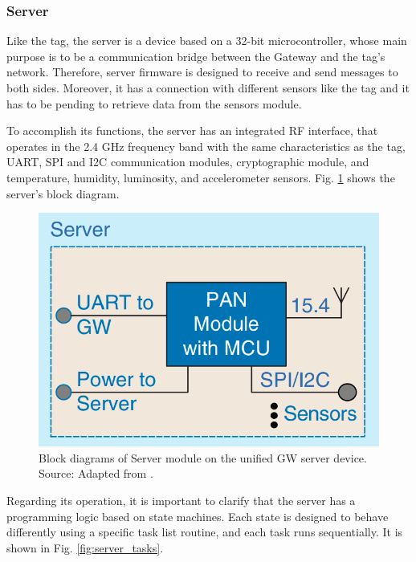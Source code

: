 \documentclass[journal]{IEEEtran}	%
\begin{document}
\subsubsection{Server}


Like the tag, the server is a device based on a 32-bit microcontroller, whose main purpose is to be a communication bridge between the Gateway and the tag's network. Therefore, server firmware is designed to receive and send messages to both sides. Moreover, it has a connection with different sensors like the tag and it has to be pending to retrieve data from the sensors module.

To accomplish its functions, the server has an integrated RF interface, that operates in the 2.4 GHz frequency band with the same characteristics as the tag, UART, SPI and I2C communication modules, cryptographic module, and temperature, humidity, luminosity, and accelerometer sensors. Fig. \ref{fig:server} shows the server's block diagram.

\begin{figure}[t!]
\centering
\includegraphics[width=0.9\columnwidth]{fig5.png}
\caption{Block diagrams of Server module on the unified GW server device. Source: Adapted from \cite{williams2017weaving}.}
\label{fig:server}
\end{figure}

Regarding its operation, it is important to clarify that the server has a programming logic based on state machines. Each state is designed to behave differently using a specific task list routine, and each task runs sequentially. It is shown in Fig. \ref{fig:server_tasks}.
\end{document}
